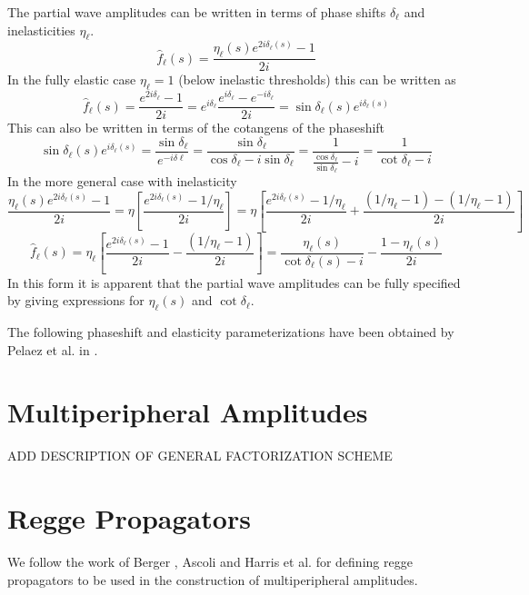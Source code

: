 \documentclass[12pt]{article}
\begin{document}
The partial wave amplitudes can be written in terms of phase shifts $\delta_\ell$ and inelasticities $\eta_\ell$.
\begin{equation}
\hat{f}_\ell(s)=\frac{\eta_\ell(s) e^{2i\delta_\ell(s)} -1}{2i}
\end{equation}
In the fully elastic case $\eta_\ell=1$ (below inelastic thresholds) this can be written as
\begin{equation}
\hat{f}_\ell(s)=\frac{e^{2i\delta_\ell} -1}{2i}=e^{i\delta_\ell}\frac{e^{i\delta_\ell}-e^{-i\delta_\ell}}{2i}=\sin\delta_\ell(s)e^{i\delta_\ell(s)}
\end{equation}
This can also be written in terms of the cotangens of the phaseshift
\begin{equation}
\sin\delta_\ell(s)e^{i\delta_\ell(s)}=\frac{\sin\delta_\ell}{e^{-i\delta\ell}}=\frac{\sin \delta_\ell}{\cos \delta_\ell - i\sin\delta_\ell}=\frac{1}{\frac{\cos\delta_\ell}{\sin\delta_\ell}-i}=\frac{1}{\cot\delta_\ell-i}
\end{equation}
In the more general case with inelasticity
\begin{equation}
  \frac{\eta_\ell(s) e^{2i\delta_\ell(s)} -1}{2i}=\eta\left[\frac{e^{2i\delta_\ell(s)} -1/\eta_\ell}{2i}\right]=\eta\left[\frac{e^{2i\delta_\ell(s)} -1/\eta_\ell}{2i}+\frac{(1/\eta_\ell-1) - (1/\eta_\ell -1)}{2i} \right]
\end{equation}
\begin{equation}
\hat{f}_\ell(s)=\eta_\ell\left[\frac{e^{2i\delta_\ell(s)} -1}{2i}-\frac{(1/\eta_\ell -1)}{2i} \right]=\frac{\eta_\ell(s)}{\cot\delta_\ell(s)-i}-\frac{1-\eta_\ell(s)}{2i}
\end{equation}
In this form it is apparent that the partial wave amplitudes can be fully specified by giving expressions for $\eta_\ell(s)$ and $\cot\delta_\ell$.

The following phaseshift and elasticity parameterizations have been obtained by Pelaez et al. in \cite{pipiI,pipiII,pipiIII}.

\section{Multiperipheral Amplitudes}
ADD DESCRIPTION OF GENERAL FACTORIZATION SCHEME

\section{Regge Propagators}

We follow the work of Berger \cite{BergerDeck}, Ascoli \cite {AscoliDeck} and Harris et al.\cite{Harris} for defining regge propagators to be used in the construction of multiperipheral  amplitudes.
\end{document}
